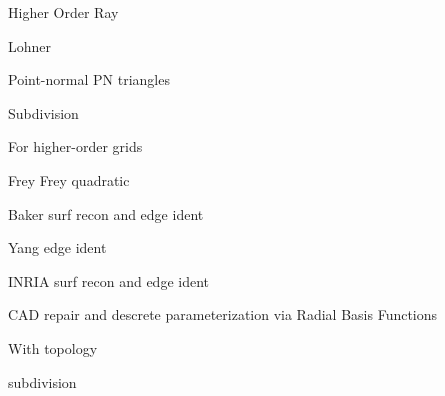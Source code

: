 \documentclass{article}
\begin{document}
Higher Order Ray\cite{ray-delany-einstein-jiao-robust-ho-surf-recon-remesh}

Lohner\cite{lohner-regridding-surface}
\cite{kim-takano-nakahashi-adjoint-adapt,kim-nakahashi-adjoint-adapt-viscous}

Point-normal PN triangles\cite{vlachos-curved-pn-triangles}

Subdivision\cite{haimes-imr15-subdivision}

For higher-order grids\cite{unstruct-3d-ho-grid-dg-surf-recon}
\cite{jiao-wang-resonstruct-ho-surf}

Frey\cite{frey-imr9-about-surface-remeshing}
Frey quadratic\cite{dapogny-dobrzynski-frey-3d-adapt-surf-recon}

Baker surf recon and edge ident\cite{baker-imr13}

Yang edge ident\cite{yang-zheng-wang-joint-line-detection-tri}

INRIA surf recon and edge ident\cite{borouchaki-surface-reconstruction}

CAD repair and descrete parameterization via Radial Basis Functions
\cite{cad-repair-discrete-param-rbf}

With topology\cite{lepage-habashi-cad-reconstruction}

subdivision\cite{haimes-imr15-subdivision}




\end{document}
